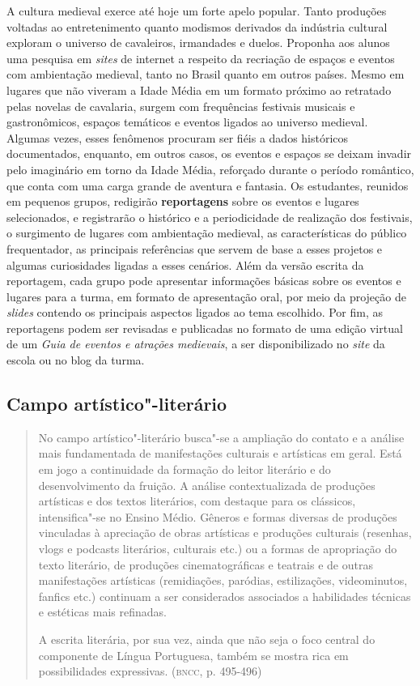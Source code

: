 \documentclass{extarticle}
\begin{document}
  A cultura medieval exerce até hoje um forte apelo popular. Tanto
  produções voltadas ao entretenimento quanto modismos derivados da
  indústria cultural exploram o universo de cavaleiros, irmandades e
  duelos. Proponha aos alunos uma pesquisa em \emph{sites} de internet a
  respeito da recriação de espaços e eventos com ambientação medieval,
  tanto no Brasil quanto em outros países. Mesmo em lugares que não
  viveram a Idade Média em um formato próximo ao retratado pelas novelas
  de cavalaria, surgem com frequências festivais musicais e
  gastronômicos, espaços temáticos e eventos ligados ao universo
  medieval. Algumas vezes, esses fenômenos procuram ser fiéis a dados
  históricos documentados, enquanto, em outros casos, os eventos e
  espaços se deixam invadir pelo imaginário em torno da Idade Média,
  reforçado durante o período romântico, que conta com uma carga grande
  de aventura e fantasia. Os estudantes, reunidos em pequenos grupos,
  redigirão \textbf{reportagens} sobre os eventos e lugares
  selecionados, e registrarão o histórico e a periodicidade de
  realização dos festivais, o surgimento de lugares com ambientação
  medieval, as características do público frequentador, as principais
  referências que servem de base a esses projetos e algumas curiosidades
  ligadas a esses cenários. Além da versão escrita da reportagem, cada
  grupo pode apresentar informações básicas sobre os eventos e lugares
  para a turma, em formato de apresentação oral, por meio da projeção de
  \emph{slides} contendo os principais aspectos ligados ao tema
  escolhido. Por fim, as reportagens podem ser revisadas e publicadas no
  formato de uma edição virtual de um \emph{Guia de eventos e atrações
  medievais}, a ser disponibilizado no \emph{site} da escola ou no blog
  da turma.

\subsection{Campo artístico"-literário }

\begin{quote}
No campo artístico"-literário busca"-se a ampliação do contato e a
análise mais fundamentada de manifestações culturais e artísticas em
geral. Está em jogo a continuidade da formação do leitor literário e do
desenvolvimento da fruição. A análise contextualizada de produções
artísticas e dos textos literários, com destaque para os clássicos,
intensifica"-se no Ensino Médio. Gêneros e formas diversas de produções
vinculadas à apreciação de obras artísticas e produções culturais
(resenhas, vlogs e podcasts literários, culturais etc.) ou a formas de
apropriação do texto literário, de produções cinematográficas e teatrais
e de outras manifestações artísticas (remidiações, paródias,
estilizações, videominutos, fanfics etc.) continuam a ser considerados
associados a habilidades técnicas e estéticas mais refinadas.

A escrita literária, por sua vez, ainda que não seja o foco central do
componente de Língua Portuguesa, também se mostra rica em possibilidades
expressivas. (\textsc{bncc}, p. 495-496)
\end{quote}
\end{document}
